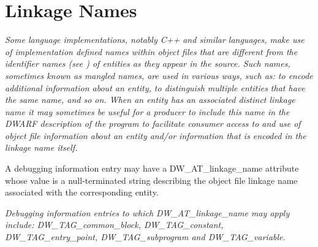 \section{Linkage Names}
\label{chap:linkagenames}
\textit{Some language implementations, notably C++ and similar
languages, make use of implementation defined names within
object files that are different from the identifier names
(see ) of entities as they appear in the
source. Such names, sometimes known as mangled names,
are used in various ways, such as: to encode additional
information about an entity, to distinguish multiple entities
that have the same name, and so on. When an entity has an
associated distinct linkage name it may sometimes be useful
for a producer to include this name in the DWARF description
of the program to facilitate consumer access to and use of
object file information about an entity and/or information
that is encoded in the linkage name itself.  
}

A debugging
information entry may have a DW\-\_AT\-\_linkage\-\_name attribute
whose value is a null-terminated string describing the object
file linkage name associated with the corresponding entity.

\textit{Debugging information entries to which DW\-\_AT\-\_linkage\-\_name
may apply include: DW\-\_TAG\-\_common\-\_block, DW\-\_TAG\-\_constant,
DW\-\_TAG\-\_entry\-\_point, DW\-\_TAG\-\_subprogram 
and DW\-\_TAG\-\_variable.
}
